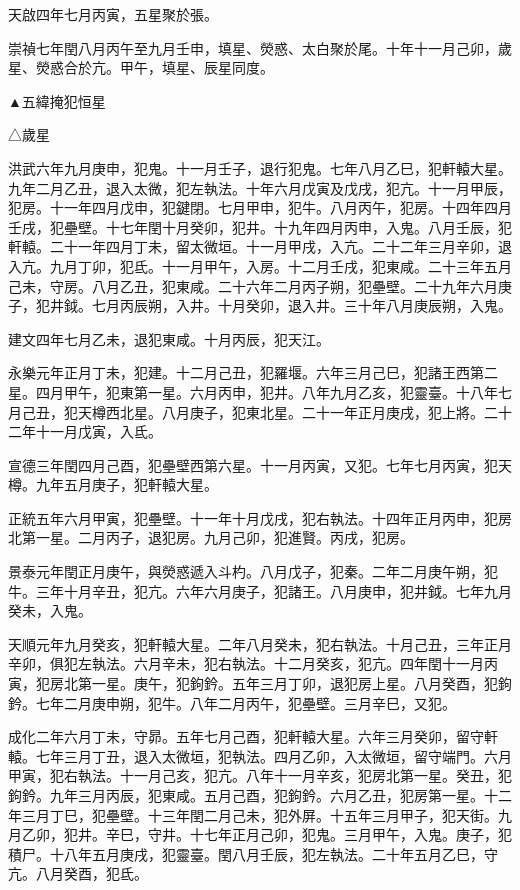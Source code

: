\begin{pinyinscope}
天啟四年七月丙寅，五星聚於張。

崇禎七年閏八月丙午至九月壬申，填星、熒惑、太白聚於尾。十年十一月己卯，歲星、熒惑合於亢。甲午，填星、辰星同度。

▲五緯掩犯恒星

△歲星

洪武六年九月庚申，犯鬼。十一月壬子，退行犯鬼。七年八月乙巳，犯軒轅大星。九年二月乙丑，退入太微，犯左執法。十年六月戊寅及戊戌，犯亢。十一月甲辰，犯房。十一年四月戊申，犯鍵閉。七月甲申，犯牛。八月丙午，犯房。十四年四月壬戌，犯壘壁。十七年閏十月癸卯，犯井。十九年四月丙申，入鬼。八月壬辰，犯軒轅。二十一年四月丁未，留太微垣。十一月甲戌，入亢。二十二年三月辛卯，退入亢。九月丁卯，犯氐。十一月甲午，入房。十二月壬戌，犯東咸。二十三年五月己未，守房。八月乙丑，犯東咸。二十六年二月丙子朔，犯壘壁。二十九年六月庚子，犯井鉞。七月丙辰朔，入井。十月癸卯，退入井。三十年八月庚辰朔，入鬼。

建文四年七月乙未，退犯東咸。十月丙辰，犯天江。

永樂元年正月丁未，犯建。十二月己丑，犯羅堰。六年三月己巳，犯諸王西第二星。四月甲午，犯東第一星。六月丙申，犯井。八年九月乙亥，犯靈臺。十八年七月己丑，犯天樽西北星。八月庚子，犯東北星。二十一年正月庚戌，犯上將。二十二年十一月戊寅，入氐。

宣德三年閏四月己酉，犯壘壁西第六星。十一月丙寅，又犯。七年七月丙寅，犯天樽。九年五月庚子，犯軒轅大星。

正統五年六月甲寅，犯壘壁。十一年十月戊戌，犯右執法。十四年正月丙申，犯房北第一星。二月丙子，退犯房。九月己卯，犯進賢。丙戌，犯房。

景泰元年閏正月庚午，與熒惑遞入斗杓。八月戊子，犯秦。二年二月庚午朔，犯牛。三年十月辛丑，犯亢。六年六月庚子，犯諸王。八月庚申，犯井鉞。七年九月癸未，入鬼。

天順元年九月癸亥，犯軒轅大星。二年八月癸未，犯右執法。十月己丑，三年正月辛卯，俱犯左執法。六月辛未，犯右執法。十二月癸亥，犯亢。四年閏十一月丙寅，犯房北第一星。庚午，犯鉤鈐。五年三月丁卯，退犯房上星。八月癸酉，犯鉤鈐。七年二月庚申朔，犯牛。八年二月丙午，犯壘壁。三月辛巳，又犯。

成化二年六月丁未，守昴。五年七月己酉，犯軒轅大星。六年三月癸卯，留守軒轅。七年三月丁丑，退入太微垣，犯執法。四月乙卯，入太微垣，留守端門。六月甲寅，犯右執法。十一月己亥，犯亢。八年十一月辛亥，犯房北第一星。癸丑，犯鉤鈐。九年三月丙辰，犯東咸。五月己酉，犯鉤鈐。六月乙丑，犯房第一星。十二年三月丁巳，犯壘壁。十三年閏二月己未，犯外屏。十五年三月甲子，犯天街。九月乙卯，犯井。辛巳，守井。十七年正月己卯，犯鬼。三月甲午，入鬼。庚子，犯積尸。十八年五月庚戌，犯靈臺。閏八月壬辰，犯左執法。二十年五月乙巳，守亢。八月癸酉，犯氐。


\end{pinyinscope}
